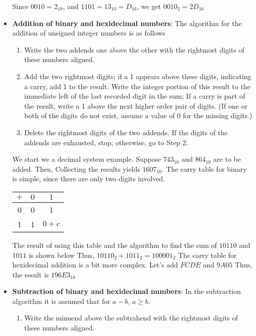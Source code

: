 \documentclass{report}
\begin{document}
\begin{itemize}
            Since $0010 =2_{10}$, and $1101 = 13_{10} = D_{16}$, we get $0010_{2} = 2D_{16} $
        \item \textbf{Addition of binary and hexidecimal numbers}: The algorithm for the addition of unsigned integer numbers is as follows
            \begin{enumerate}
                \item Write the two addends one above the other with the rightmost digits of these numbers aligned.
                \item Add the two rightmost digits; if a 1 appears above these digits, indicating a carry, add 1 to the result. Write the integer portion of this result to the immediate left of the last recorded digit in the sum; If a carry is part of the result, write a 1 above the next higher order pair of digits. (If one or both of the digits do not exist, assume a value of 0 for the missing digits.)
                \item Delete the rightmost digits of the two addends. If the digits of the addends are exhausted, stop; otherwise, go to Step 2.
            \end{enumerate}
            We start we a decimal system example. Suppose $743_{10}$ and  $864_{10}$ are to be added. Then,
            \bigbreak \noindent 
            \bigbreak \noindent 
            Collecting the results yields $1607_{10}$. The carry table for binary is simple, since there are only two digits involved.
            \begin{center}
                \begin{tabular}{c|c|c}
                    $+$ & $0$ & $1$ \\
                    \hline
                    0 & 0 & 1 \\
                    \hline
                    1 & 1 & $0+c$
                \end{tabular}
            \end{center}
            The result of using this table and the algorithm to find the sum of $10110$ and $1011$ is shown below
            \bigbreak \noindent 
            \bigbreak \noindent 
            Thus, $10110_{2} + 1011_{2} = 100001_{2} $
            \bigbreak \noindent 
            The carry table for hexidecimal addition is a bit more complex.
            \bigbreak \noindent 
            \bigbreak \noindent 
            Let's add $FCDE$ and $9A05 $
            \bigbreak \noindent 
            \bigbreak \noindent 
            Thus, the result is $196E3_{16} $
        \item \textbf{Subtraction of binary and hexidecimal numbers}: In the subtraction algorithm it is assumed that for $a-b$, $a \geq b$.
            \begin{enumerate}
                \item Write the minuend above the subtrahend with the rightmost digits of these numbers aligned.


\end{enumerate}
\end{itemize}
\end{document}
